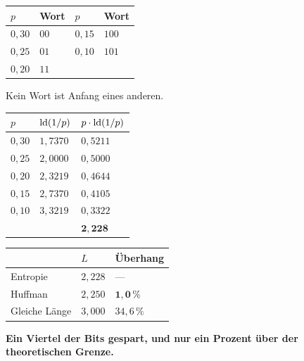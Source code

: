 \begin{aufgabe}
\begin{center}
\renewcommand{\arraystretch}{1.46}
\begin{tabular}{@{}P{1.8cm}P{1.8cm}P{1.8cm}P{1.8cm}@{}}
\toprule
$p$ & \textbf{Wort} & $p$ & \textbf{Wort}\\
\midrule
$0{,}30$ & $00$ & $0{,}15$ & $100$\\
$0{,}25$ & $01$ & $0{,}10$ & $101$\\
$0{,}20$ & $11$ & & \\
\bottomrule
\end{tabular}
\end{center}

 Kein Wort ist Anfang eines anderen. \checkmark

\begin{center}
{\small
\renewcommand{\arraystretch}{1.46}
\begin{tabular}{@{}P{1.6cm}P{2.2cm}P{2.4cm}@{}}
\toprule
$p$ & $\operatorname{ld}(1/p)$ & $p\cdot\operatorname{ld}(1/p)$\\
\midrule
$0{,}30$ & $1{,}7370$ & $0{,}5211$\\
$0{,}25$ & $2{,}0000$ & $0{,}5000$\\
$0{,}20$ & $2{,}3219$ & $0{,}4644$\\
$0{,}15$ & $2{,}7370$ & $0{,}4105$\\
$0{,}10$ & $3{,}3219$ & $0{,}3322$\\
\midrule
& & $\mathbf{2{,}228}$\\
\bottomrule
\end{tabular}}
\end{center}

\begin{center}
{\small
\renewcommand{\arraystretch}{1.48}
\begin{tabular}{@{}P{2.6cm}P{1.8cm}P{2.6cm}@{}}
\toprule
& $L$ & \textbf{Überhang}\\
\midrule
Entropie & $2{,}228$ & ---\\
Huffman & $2{,}250$ & $\mathbf{1{,}0\,\%}$\\
Gleiche Länge & $3{,}000$ & $34{,}6\,\%$\\
\bottomrule
\end{tabular}}
\end{center}

\begin{center}
\begin{minipage}{0.9\textwidth}
\textbf{Ein Viertel der Bits gespart, und nur ein Prozent über der theoretischen Grenze.}
\end{minipage}
\end{center}


\end{aufgabe}
